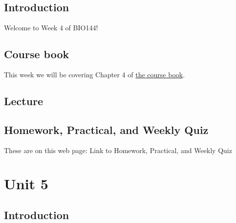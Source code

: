 \documentclass[
  letterpaper,
  8pt,
  a4paper]{book}
\begin{document}
\section*{Introduction}\label{introduction-4}


Welcome to Week 4 of BIO144!

\section*{Course book}\label{course-book-3}


This week we will be covering Chapter 4 of
\href{https://opetchey.github.io/BIO144_Course_Book/}{the course book}.

\section*{Lecture}\label{lecture-3}


\section*{Homework, Practical, and Weekly
Quiz}\label{homework-practical-and-weekly-quiz-3}


These are on this web page: Link to Homework, Practical, and Weekly Quiz


\chapter*{Unit 5}\label{unit-5}


\section*{Introduction}\label{introduction-5}

\end{document}
